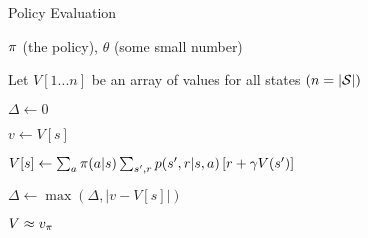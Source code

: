 
\begin{algorithm}
\caption{Policy Evaluation}
\label{alg:poleval}

\begin{algorithmic}[0]

	\Require $\pi$ (the policy), $\theta$ (some small number)

	\State Let $V[1...n]$ be an array of values for all states
	$(n = |\mathcal{S}|)$

	\Repeat

		\State $\Delta \gets 0$


			\State $v \gets V[s]$

			\State $V[s] \gets
				\sum_a {\pi(a|s)}
				\sum_{s',r} {p(s',r|s,a)\left[r + \gamma V(s')\right]}$

			\State $\Delta \gets \max(\Delta,|v-V[s]|)$

		\EndFor

	\Until{$\Delta < \theta$}

	\State \Return $V \approx v_\pi$

\end{algorithmic}

\end{algorithm}
